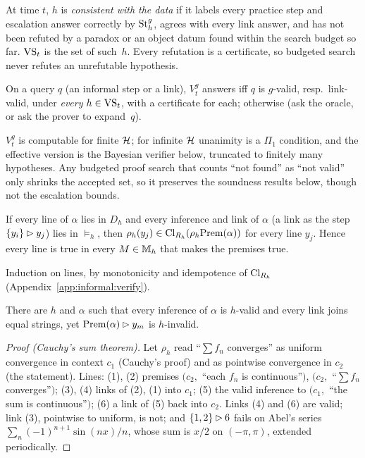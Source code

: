 At time $t$, $h$ is \emph{consistent with the data} if it labels every practice step and escalation answer correctly by $\mathrm{St}^{g}_{h}$, agrees with every link answer, and has not been refuted by a paradox or an object datum found within the search budget so far. $\mathrm{VS}_t$ is the set of such~$h$. Every refutation is a certificate, so budgeted search never refutes an unrefutable hypothesis.

\begin{definition}\label{def:informal:verifier}
On a query $q$ (an informal step or a link), $V^g_t$ answers \ACCEPT{} iff $q$ is $g$-valid, resp.\ link-valid, under \emph{every} $h\in\mathrm{VS}_t$, with a certificate for each; otherwise \ESCALATE{} (ask the oracle, or ask the prover to expand~$q$).
\end{definition}

$V^g_t$ is computable for finite $\mathcal{H}$; for infinite $\mathcal{H}$ unanimity is a $\Pi_1$ condition, and the effective version is the Bayesian verifier below, truncated to finitely many hypotheses. Any budgeted proof search that counts ``not found'' as ``not valid'' only shrinks the accepted set, so it preserves the soundness results below, though not the escalation bounds.

\begin{lemma}\label{lem:informal:argument}
If every line of $\alpha$ lies in $D_h$ and every inference and link of $\alpha$ (a link as the step $\{y_i\}\rhd y_j$) lies in ${\models_h}$, then $\rho_h(y_j)\in\mathrm{Cl}_{R_h}(\rho_h\mathrm{Prem}(\alpha))$ for every line $y_j$. Hence every line is true in every $M\in\mathbb M_h$ that makes the premises true.
\end{lemma}

Induction on lines, by monotonicity and idempotence of $\mathrm{Cl}_{R_h}$ (Appendix~\ref{app:informal:verify}).

\begin{proposition}\label{prop:informal:equivocation}
There are $h$ and $\alpha$ such that every inference of $\alpha$ is $h$-valid and every link joins equal strings, yet $\mathrm{Prem}(\alpha)\rhd y_m$ is $h$-invalid.
\end{proposition}

\begin{proof}[Proof (Cauchy's sum theorem)]
Let $\rho_h$ read ``$\sum f_n$ converges'' as uniform convergence in context $c_1$ (Cauchy's proof) and as pointwise convergence in $c_2$ (the statement). Lines: (1), (2) premises $(c_2,$ ``each $f_n$ is continuous''$)$, $(c_2,$ ``$\sum f_n$ converges''$)$; (3), (4) links of (2), (1) into $c_1$; (5) the valid inference to $(c_1,$ ``the sum is continuous''$)$; (6) a link of (5) back into $c_2$. Links (4) and (6) are valid; link (3), pointwise to uniform, is not; and $\{1,2\}\rhd6$ fails on Abel's series $\sum_n(-1)^{n+1}\sin(nx)/n$, whose sum is $x/2$ on $(-\pi,\pi)$, extended periodically.
\end{proof}


